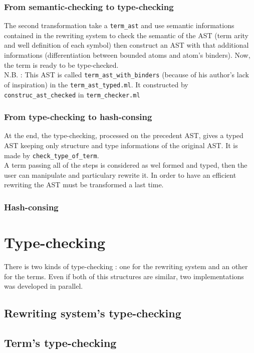 \documentclass[12pt,a4paper]{article}
\begin{document}
\subsubsection{From semantic-checking to type-checking}
The second transformation take a \verb?term_ast? and use semantic informations
contained in the rewriting system to check the semantic of the AST (term
arity and well definition of each symbol)  then
construct an AST with that additional informations (differentiation between
bounded atoms and atom's binders). Now, the term is ready to be type-checked.
\\
N.B. : This AST is called \verb?term_ast_with_binders? (because of his
author's lack of inspiration) in the \verb?term_ast_typed.ml?.
It constructed by \verb?construc_ast_checked? in \verb?term_checker.ml?

\subsubsection{From type-checking to hash-consing}
At the end, the type-checking, processed on the precedent AST, gives a
typed AST keeping only structure and type informations of the original AST.
It is made by \verb?check_type_of_term?.
\\
A term passing all of the steps is considered as wel formed and typed, then
the user can manipulate and particulary rewrite it. In order to have an
efficient rewriting the AST must be transformed a last time.

\subsubsection{Hash-consing}
\label{data-term-hash-consing}


\section{Type-checking}
\label{typechecking}
There is two kinds of type-checking : one for the rewriting system and an
other for the terms. Even if both of this structures are similar, two
implementations was developed in parallel.

\subsection{Rewriting system's type-checking}

\subsection{Term's type-checking}
\end{document}

